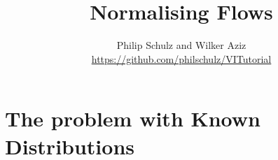 \documentclass[14pt]{beamer}
\title{Normalising Flows}
\author{Philip Schulz and Wilker Aziz\\
\url{https://github.com/philschulz/VITutorial}}
\date{}
\begin{document}
\begin{frame}
\maketitle
\end{frame}

\begin{frame}
\tableofcontents
\end{frame}

\section{The problem with Known Distributions}

\begin{frame}
\tableofcontents[current]
\end{frame}
\end{document}
